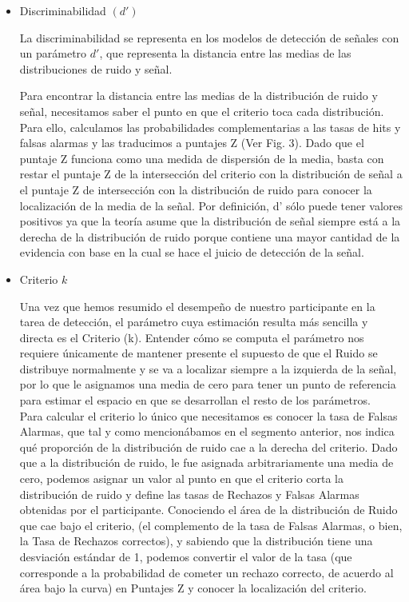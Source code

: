 \begin{itemize}
\item Discriminabilidad $(d')$

La discriminabilidad se representa en los modelos de detección de señales con un parámetro $d'$, que representa la distancia entre las medias de las distribuciones de ruido y señal. 



Para encontrar la distancia entre las medias de la distribución de ruido y señal, necesitamos saber el punto en que el criterio toca cada distribución. Para ello, calculamos las probabilidades complementarias a las tasas de hits y falsas alarmas y las traducimos a puntajes Z (Ver Fig. 3). Dado que el puntaje Z funciona como una medida de dispersión de la media, basta con restar el puntaje Z de la intersección del criterio con la distribución de señal a el puntaje Z de intersección con la distribución de ruido para conocer la localización de la media de la señal. Por definición, d’ sólo puede tener valores positivos ya que la teoría asume que la distribución de señal siempre está a la derecha de la distribución de ruido porque contiene una mayor cantidad de la evidencia con base en la cual se hace el juicio de detección de la señal.



\item Criterio  $k$

Una vez que hemos resumido el desempeño de nuestro participante en la tarea de detección, el parámetro cuya estimación resulta más sencilla y directa es el Criterio (k). Entender cómo se computa el parámetro nos requiere únicamente de mantener presente el supuesto de que el Ruido se distribuye normalmente y se va a localizar siempre a la izquierda de la señal, por lo que le asignamos una media de cero para tener un punto de referencia para estimar el espacio en que se desarrollan el resto de los parámetros. \\

Para calcular el criterio lo único que necesitamos es conocer la tasa de Falsas Alarmas, que tal y como mencionábamos en el segmento anterior, nos indica qué proporción de la distribución de ruido cae a la derecha del criterio. Dado que a la distribución de ruido, le fue asignada arbitrariamente una media de cero, podemos asignar un valor al punto en que el criterio corta la distribución de ruido y define las tasas de Rechazos y Falsas Alarmas obtenidas por el participante. Conociendo el área de la distribución de Ruido que cae bajo el criterio, (el complemento de la tasa de Falsas Alarmas, o bien, la Tasa de Rechazos correctos), y sabiendo que la distribución tiene una desviación estándar de 1, podemos convertir el valor de la tasa (que corresponde a la probabilidad de cometer un rechazo correcto, de acuerdo al área bajo la curva) en Puntajes Z y conocer la localización del criterio.\\


\end{itemize}
